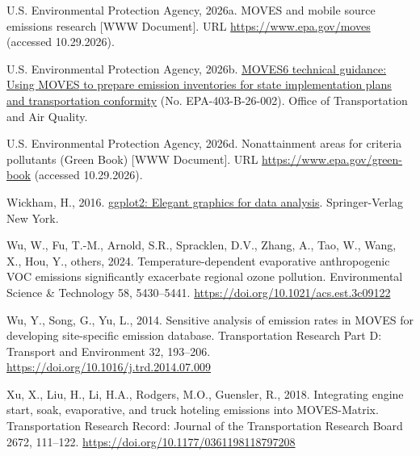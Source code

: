 \documentclass[preprint,
3p]{elsarticle} %
\newlength{\cslhangindent}
\newenvironment{CSLReferences}[2] %
 {\begin{list}{}{%
  \setlength{\itemindent}{0pt}
  \setlength{\leftmargin}{0pt}
  \setlength{\parsep}{0pt}
  \ifodd #1
   \setlength{\leftmargin}{\cslhangindent}
   \setlength{\itemindent}{-1\cslhangindent}
  \fi
  \setlength{\itemsep}{#2\baselineskip}}}
 {\end{list}}
\begin{document}
\begin{CSLReferences}{1}{0}
U.S. Environmental Protection Agency, 2026a. {MOVES} and mobile source
emissions research {[}WWW Document{]}. URL
\url{https://www.epa.gov/moves} (accessed 10.29.2026).

U.S. Environmental Protection Agency, 2026b.
\href{https://www.epa.gov/moves/latest-version-motor-vehicle-emission-simulator-moves}{{MOVES6}
technical guidance: Using {MOVES} to prepare emission inventories for
state implementation plans and transportation conformity} (No.
EPA-403-B-26-002). {Office of Transportation and Air Quality}.

U.S. Environmental Protection Agency, 2026d. Nonattainment areas for
criteria pollutants ({Green Book}) {[}WWW Document{]}. URL
\url{https://www.epa.gov/green-book} (accessed 10.29.2026).

Wickham, H., 2016. \href{https://ggplot2.tidyverse.org}{ggplot2: Elegant
graphics for data analysis}. Springer-Verlag New York.

Wu, W., Fu, T.-M., Arnold, S.R., Spracklen, D.V., Zhang, A., Tao, W.,
Wang, X., Hou, Y., others, 2024. Temperature-dependent evaporative
anthropogenic {VOC} emissions significantly exacerbate regional ozone
pollution. Environmental Science \& Technology 58, 5430--5441.
\url{https://doi.org/10.1021/acs.est.3c09122}

Wu, Y., Song, G., Yu, L., 2014. Sensitive analysis of emission rates in
{MOVES} for developing site-specific emission database. Transportation
Research Part D: Transport and Environment 32, 193--206.
\url{https://doi.org/10.1016/j.trd.2014.07.009}

Xu, X., Liu, H., Li, H.A., Rodgers, M.O., Guensler, R., 2018.
Integrating engine start, soak, evaporative, and truck hoteling
emissions into {MOVES-Matrix}. Transportation Research Record: Journal
of the Transportation Research Board 2672, 111--122.
\url{https://doi.org/10.1177/0361198118797208}

\end{CSLReferences}
\end{document}
